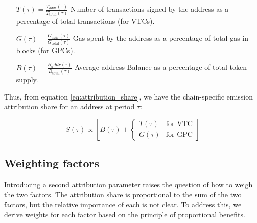 \documentclass[11pt]{report}
\begin{document}
\begin{description}[leftmargin=!, labelwidth=\widthof{\bfseries Passive Behavior}]

    \item[Interactive Behavior $(I)$] \hfill
        \begin{itemize}[labelwidth=4cm, align=left, labelsep=0pt]
            \item[\( T(\tau) = \frac{T_{addr}(\tau)}{T_{\text{total}}(\tau)} \)]
                Number of transactions signed by the address as a percentage of total transactions (for VTCs).

            \item[\(G(\tau) = \frac{G_{addr}(\tau)}{G_{\text{total}}(\tau)} \)]
                Gas spent by the address as a percentage of total gas in blocks (for GPCs).
        \end{itemize}

    \item[Passive Behavior $P$] \hfil
        \begin{itemize}[labelwidth=4cm, align=left, labelsep=0pt]
            \item[\(B(\tau) = \frac{B_addr(\tau)}{B_{\text{total}}(\tau)} \)]
                Average address Balance as a percentage of total token supply.
        \end{itemize}

\end{description}
\parsep 5pt
Thus, from equation \eqref{eq:attribution_share}, we have the chain-specific emission attribution share for an address at period $\tau$:


\begin{equation}
    S(\tau) \propto \left[B(\tau) + \begin{cases}
            T(\tau) & \text{for VTC} \\
            G(\tau) & \text{for GPC}
        \end{cases}\right]
    \label{eq:attribution_share_chain_type}
\end{equation}

\subsection{Weighting factors}

Introducing a second attribution parameter raises the question of how to weigh the two factors. The attribution share is proportional to the sum of the two factors, but the relative importance of each is not clear. To address this, we derive weights for each factor based on the principle of proportional benefits.
\end{document}
